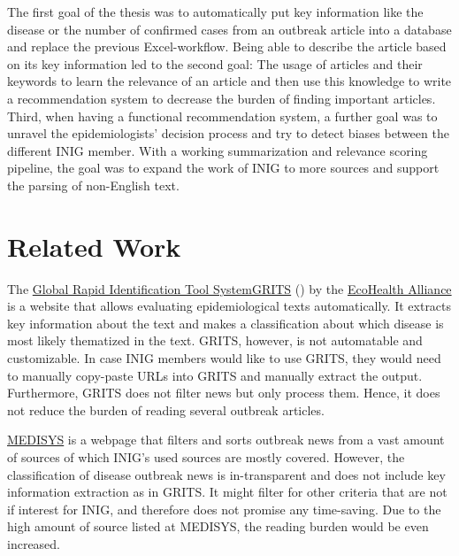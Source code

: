   The first goal of the thesis was to automatically put key information like the disease or the number of confirmed cases from an outbreak article into a database and replace the previous Excel-workflow. Being able to describe the article based on its key information led to the second goal: The usage of articles and their keywords to learn the relevance of an article and then use this knowledge to write a recommendation system to decrease the burden of finding important articles.
  Third, when having a functional recommendation system, a further goal was to unravel the epidemiologists' decision process and try to detect biases between the different INIG member.
  With a working summarization and relevance scoring pipeline, the goal was to expand the work of INIG to more sources and support the parsing of non-English text.


\section{Related Work}
  The \href{https://grits.eha.io}{Global Rapid Identification Tool SystemGRITS} () by the \href{https://www.ecohealthalliance.org}{EcoHealth Alliance} is a website that allows evaluating epidemiological texts automatically.
  It extracts key information about the text and makes a classification about which disease is most likely thematized in the text.
  GRITS, however, is not automatable and customizable.
  In case INIG members would like to use GRITS, they would need to manually copy-paste URLs into GRITS and manually extract the output.
  Furthermore, GRITS does not filter news but only process them.
  Hence, it does not reduce the burden of reading several outbreak articles.

  \href{http://medisys.newsbrief.eu}{MEDISYS} is a webpage that filters and sorts outbreak news from a vast amount of sources of which INIG's used sources are mostly covered.
  However, the classification of disease outbreak news is in-transparent and does not include key information extraction as in GRITS.
  It might filter for other criteria that are not if interest for INIG, and therefore does not promise any time-saving.
  Due to the high amount of source listed at MEDISYS, the reading burden would be even increased.

